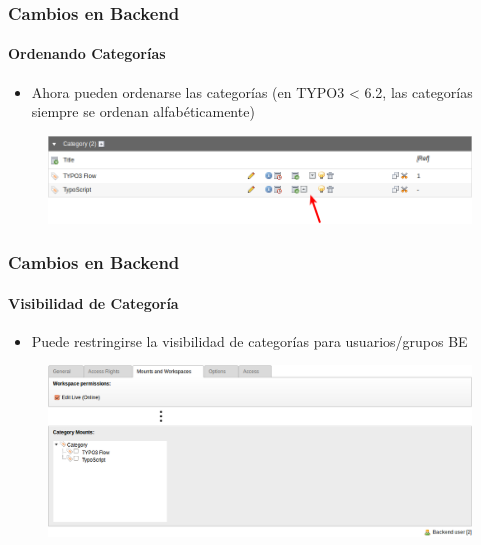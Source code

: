 
\begin{frame}[fragile]
	\frametitle{Cambios en Backend}
	\framesubtitle{Ordenando Categorías}

 	\begin{itemize}
		\item Ahora pueden ordenarse las categorías\newline
			\small(en TYPO3 < 6.2, las categorías siempre se ordenan alfabéticamente)\normalsize
	\end{itemize}

	\begin{figure}
		\includegraphics[width=0.95\linewidth]{Images/BackendChanges/CategorySorting.png}
	\end{figure}

\end{frame}


\begin{frame}[fragile]
	\frametitle{Cambios en Backend}
	\framesubtitle{Visibilidad de Categoría}

 	\begin{itemize}
		\item Puede restringirse la visibilidad de categorías para usuarios/grupos BE
	\end{itemize}

	\begin{figure}
		\includegraphics[width=0.95\linewidth]{Images/BackendChanges/CategoryVisibility.png}
	\end{figure}

\end{frame}

